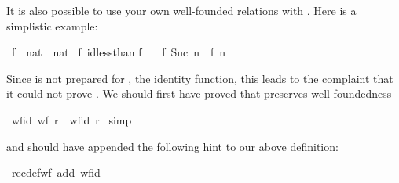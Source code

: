 \begin{isabellebody}
\begin{isamarkuptext}
It is also possible to use your own well-founded relations with .
Here is a simplistic example:%
\end{isamarkuptext}%
\ f\ {\isacharcolon}{\isacharcolon}\ {\isachardoublequote}nat\ {\isasymRightarrow}\ nat{\isachardoublequote}\isanewline
{}\ f\ {\isachardoublequote}id{\isacharparenleft}less{\isacharunderscore}than{\isacharparenright}{\isachardoublequote}\isanewline
{\isachardoublequote}f\ {}\ {\isacharequal}\ {}{\isachardoublequote}\isanewline
{\isachardoublequote}f\ {\isacharparenleft}Suc\ n{\isacharparenright}\ {\isacharequal}\ f\ n{\isachardoublequote}%
\begin{isamarkuptext}%
\noindent
Since  is not prepared for , the identity
function, this leads to the complaint that it could not prove
.
We should first have proved that  preserves well-foundedness%
\end{isamarkuptext}%
\ wf{\isacharunderscore}id{\isacharcolon}\ {\isachardoublequote}wf\ r\ {\isasymLongrightarrow}\ wf{\isacharparenleft}id\ r{\isacharparenright}{\isachardoublequote}\isanewline
{}\ simp%
\begin{isamarkuptext}%
\noindent
and should have appended the following hint to our above definition:%
\end{isamarkuptext}%
{\isacharparenleft}\ recdef{\isacharunderscore}wf\ add{\isacharcolon}\ wf{\isacharunderscore}id{\isacharparenright}\end{isabellebody}%
